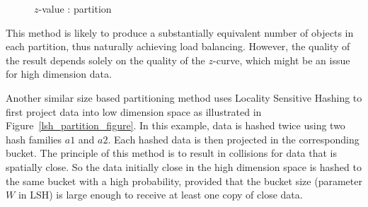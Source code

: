  
\begin{figure}[h]
\centering
{}
\caption{$z$-value : partition \label{projection_partition_figure}}
\end{figure}


This method is likely to produce a substantially equivalent number of objects in each partition, thus naturally 
achieving load balancing. However, the quality of the result depends solely on the quality of the $z$-curve, which 
might be an issue for high dimension data. 


 
Another similar size based partitioning method uses Locality Sensitive Hashing to first project data into low dimension 
space as illustrated in Figure~\ref{lsh_partition_figure}. In this example, data is hashed twice using two hash 
families $a1$ and $a2$. Each hashed data is then projected in the corresponding bucket. The principle of this method is 
to result in collisions for data that is spatially close. So the data initially close in the high dimension space is 
hashed to the same bucket with a high probability, provided that the bucket size (parameter $W$ in LSH) is large enough 
to receive at least one copy of close data. 

